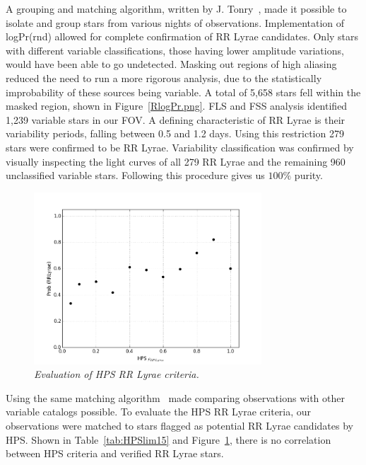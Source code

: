\documentclass[aps,prb,twocolumn,superscriptaddress]{revtex4-1}
\begin{document}
A grouping and matching algorithm, written by J. Tonry~\cite{gri}, made it possible to isolate and group 
stars from various nights of observations.  
Implementation of logPr(rnd) allowed for complete confirmation of RR Lyrae candidates.  Only stars with different 
variable classifications, those having lower amplitude variations, would have been able to go
undetected.  Masking out regions of high aliasing reduced the need to run a more rigorous analysis, %
due to the statistically improbability of these sources being variable.  A total of 5,658 stars fell within 
the masked region, shown in Figure~\ref{RlogPr.png}.  FLS and FSS analysis identified 1,239 variable stars in our FOV.  
A defining characteristic of RR Lyrae is their variability periods, falling between 0.5 and 1.2 days.  Using this 
restriction 279 stars were confirmed to be RR Lyrae.  Variability classification was confirmed by visually inspecting 
the light curves of all 279 RR Lyrae and the remaining 960 unclassified variable stars.  Following this procedure gives us 
$100\%$ purity.

\begin{figure}[H]
 \centering
 	\includegraphics[width=3.35in]{figures/NEW/probrr_vs_HPS.png}
 \caption{\it \small{Evaluation of HPS RR Lyrae criteria.}}
 \label{fig:probrrHPS}
\end{figure}

Using the same matching algorithm~\cite{gri} made comparing observations with other variable catalogs possible.  
To evaluate the HPS RR Lyrae criteria, our observations were matched to stars flagged as potential RR Lyrae candidates by HPS.  
Shown in Table~\ref{tab:HPSlim15} and Figure~\ref{fig:probrrHPS}, there is no correlation between HPS criteria and 
verified RR Lyrae stars.
\end{document}
